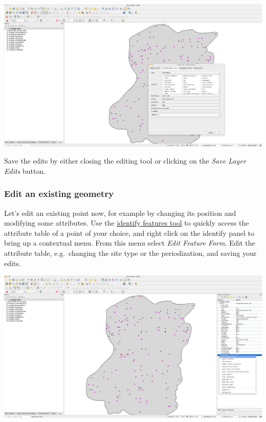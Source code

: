 \documentclass[
  letterpaper,
  DIV=11,
  numbers=noendperiod]{scrartcl}
\begin{document}
\begin{center}
\includegraphics{img/qgis-add-new-feature.png}
\end{center}

Save the edits by either closing the editing tool or clicking on the
\emph{Save Layer Edits} button.

\subsubsection{Edit an existing
geometry}\label{edit-an-existing-geometry}

Let's edit an existing point now, for example by changing its position
and modifying some attributes. Use the
\href{https://docs.qgis.org/3.34/en/docs/user_manual/introduction/general_tools.html\#identify}{identify
features tool} to quickly access the attribute table of a point of your
choice, and right click on the identify panel to bring up a contextual
menu. From this menu select \emph{Edit Feature Form}. Edit the attribute
table, e.g.~changing the site type or the periodization, and saving your
edits.

\begin{center}
\includegraphics{img/qgis-identify-attr-table.png}
\end{center}
\end{document}
